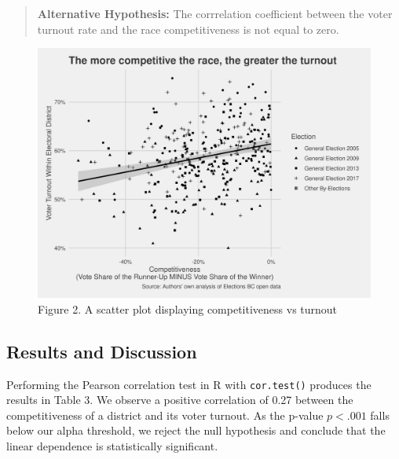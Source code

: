 \documentclass[
]{article}
\begin{document}
\begin{quote}
\textbf{Alternative Hypothesis:} The corrrelation coefficient between
the voter turnout rate and the race competitiveness is not equal to
zero.
\end{quote}

\begin{figure}
\includegraphics[width=1\linewidth]{images/scatter_plot} \caption{Figure 2. A scatter plot displaying competitiveness vs turnout}\label{fig:unnamed-chunk-3}
\end{figure}

\hypertarget{results-and-discussion}{%
\subsection{Results and Discussion}\label{results-and-discussion}}

Performing the Pearson correlation test in R with \texttt{cor.test()}
produces the results in Table 3. We observe a positive correlation of
0.27 between the competitiveness of a district and its voter turnout. As
the p-value \(p < .001\) falls below our alpha threshold, we reject the
null hypothesis and conclude that the linear dependence is statistically
significant.
\end{document}
